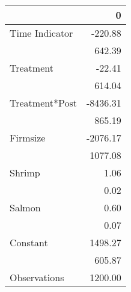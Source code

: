 \begin{tabular}{lr}
\toprule
{} &        0 \\
\midrule
Time Indicator &  -220.88 \\
               &   642.39 \\
Treatment      &   -22.41 \\
               &   614.04 \\
Treatment*Post & -8436.31 \\
               &   865.19 \\
Firmsize       & -2076.17 \\
               &  1077.08 \\
Shrimp         &     1.06 \\
               &     0.02 \\
Salmon         &     0.60 \\
               &     0.07 \\
Constant       &  1498.27 \\
               &   605.87 \\
Observations   &  1200.00 \\
\bottomrule
\end{tabular}
